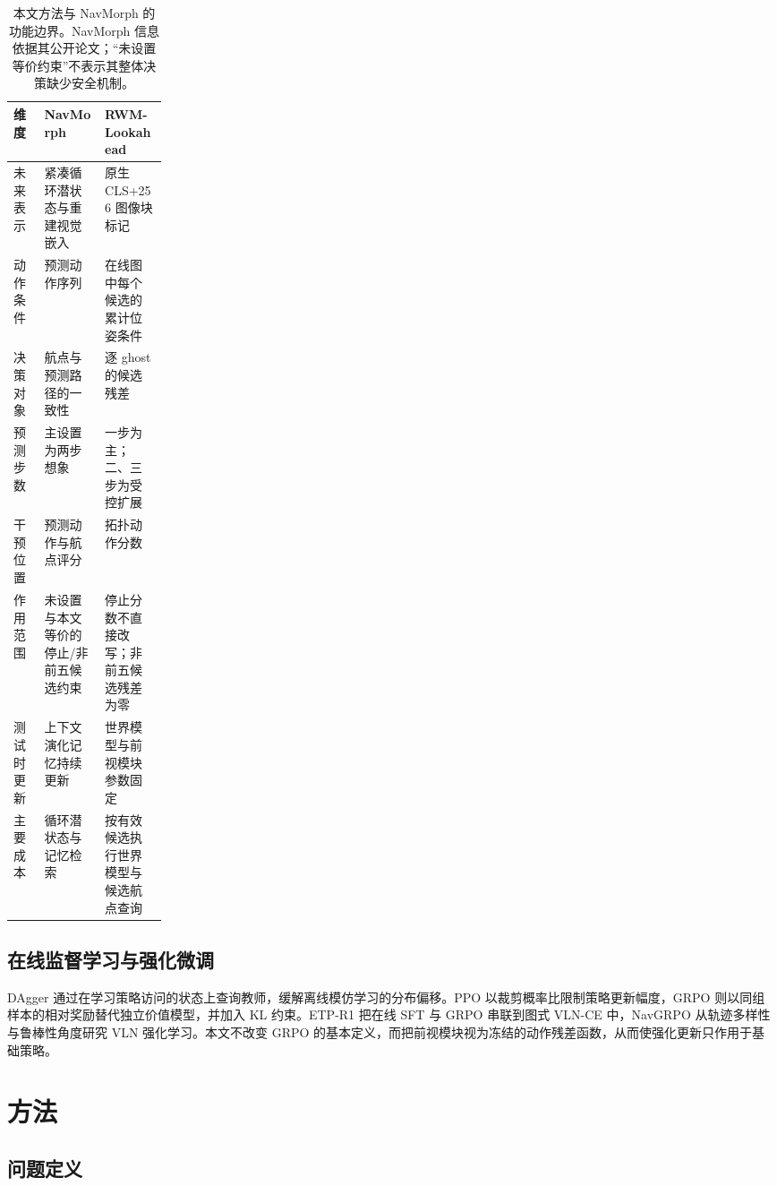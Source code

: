 \documentclass[UTF8,11pt]{ctexart}
\newcommand{\method}{RWM-Lookahead}
\begin{document}
\begin{table}[t]
\centering
\caption{本文方法与 NavMorph 的功能边界。NavMorph 信息依据其公开论文\cite{yao2025navmorph}；“未设置等价约束”不表示其整体决策缺少安全机制。}
\label{tab:navmorph}
\begin{tabularx}{\linewidth}{p{0.20\linewidth}YY}
\toprule
维度 & NavMorph & \method{} \\
\midrule
未来表示 & 紧凑循环潜状态与重建视觉嵌入 & 原生 CLS+256 图像块标记 \\
动作条件 & 预测动作序列 & 在线图中每个候选的累计位姿条件 \\
决策对象 & 航点与预测路径的一致性 & 逐 ghost 的候选残差 \\
预测步数 & 主设置为两步想象 & 一步为主；二、三步为受控扩展 \\
干预位置 & 预测动作与航点评分 & 拓扑动作分数 \\
作用范围 & 未设置与本文等价的停止/非前五候选约束 & 停止分数不直接改写；非前五候选残差为零 \\
测试时更新 & 上下文演化记忆持续更新 & 世界模型与前视模块参数固定 \\
主要成本 & 循环潜状态与记忆检索 & 按有效候选执行世界模型与候选航点查询 \\
\bottomrule
\end{tabularx}
\end{table}

\subsection{在线监督学习与强化微调}

DAgger 通过在学习策略访问的状态上查询教师，缓解离线模仿学习的分布偏移\cite{ross2011dagger}。PPO 以裁剪概率比限制策略更新幅度\cite{schulman2017ppo}，GRPO 则以同组样本的相对奖励替代独立价值模型，并加入 KL 约束\cite{shao2024deepseekmath}。ETP-R1 把在线 SFT 与 GRPO 串联到图式 VLN-CE 中\cite{ye2025etpr1}，NavGRPO 从轨迹多样性与鲁棒性角度研究 VLN 强化学习\cite{li2026navgrpo}。本文不改变 GRPO 的基本定义，而把前视模块视为冻结的动作残差函数，从而使强化更新只作用于基础策略。

\section{方法}

\subsection{问题定义}
\end{document}
